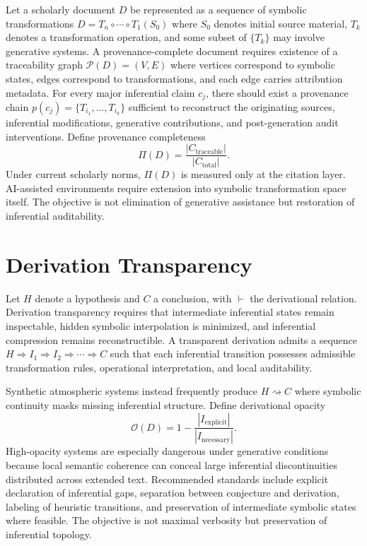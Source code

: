\documentclass[12pt, openright, twoside]{book}
\begin{document}
Let a scholarly document $D$ be represented as a sequence of symbolic
transformations $D = T_n \circ \cdots \circ T_1(S_0)$ where $S_0$ denotes
initial source material, $T_k$ denotes a transformation operation, and
some subset of $\{T_k\}$ may involve generative systems. A
provenance-complete document requires existence of a traceability graph
$\mathcal{P}(D) = (V, E)$ where vertices correspond to symbolic states,
edges correspond to transformations, and each edge carries attribution
metadata. For every major inferential claim $c_j$, there should exist a
provenance chain $p(c_j) = \{T_{i_1}, \ldots, T_{i_k}\}$ sufficient to
reconstruct the originating sources, inferential modifications, generative
contributions, and post-generation audit interventions. Define provenance
completeness
\[
\Pi(D)
= \frac{|C_{\mathrm{traceable}}|}{|C_{\mathrm{total}}|}.
\]
Under current scholarly norms, $\Pi(D)$ is measured only at the citation
layer. AI-assisted environments require extension into symbolic
transformation space itself. The objective is not elimination of generative
assistance but restoration of inferential auditability.

\section{Derivation Transparency}

Let $H$ denote a hypothesis and $C$ a conclusion, with $\vdash$ the
derivational relation. Derivation transparency requires that intermediate
inferential states remain inspectable, hidden symbolic interpolation is
minimized, and inferential compression remains reconstructible. A
transparent derivation admits a sequence
$H \Rightarrow I_1 \Rightarrow I_2 \Rightarrow \cdots \Rightarrow C$
such that each inferential transition possesses admissible transformation
rules, operational interpretation, and local auditability.

Synthetic atmospheric systems instead frequently produce $H \rightsquigarrow C$
where symbolic continuity masks missing inferential structure. Define
derivational opacity
\[
\mathcal{O}(D)
= 1 - \frac{|I_{\mathrm{explicit}}|}{|I_{\mathrm{necessary}}|}.
\]
High-opacity systems are especially dangerous under generative conditions
because local semantic coherence can conceal large inferential
discontinuities distributed across extended text. Recommended standards
include explicit declaration of inferential gaps, separation between
conjecture and derivation, labeling of heuristic transitions, and
preservation of intermediate symbolic states where feasible. The objective
is not maximal verbosity but preservation of inferential topology.
\end{document}
